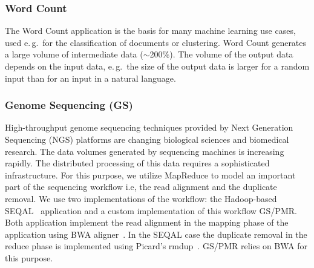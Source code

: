 \documentclass{acm_proc_article-sp}
\newcommand{\jhanote}[1]{ {\textcolor{red} { ***shantenu: #1 }}}
\newcommand{\jhanote}[1]{}
\newcommand{\pilotmapreduce}{Pilot-MapReduce\xspace}
\begin{document}

\subsubsection*{Word Count}

The Word Count application is the basis for many machine learning use cases, 
used e.\,g.\ for the classification of documents or clustering. Word Count 
generates a large volume of intermediate data ($\sim$200$\%$). The volume of the 
output data depends on the input data, e.\,g.\ the size of the output data is 
larger for a random input than for an input in a natural language. 


\subsubsection*{Genome Sequencing (GS)}

High-throughput genome sequencing techniques provided by Next Generation
Sequencing (NGS) platforms are changing biological sciences and biomedical
research. The data volumes generated by sequencing machines is increasing
rapidly. The distributed processing of this data requires a sophisticated
infrastructure. For this purpose, we utilize MapReduce to model an important
part of the sequencing workflow i.e, the read alignment and the duplicate
removal. We use two implementations of the workflow: the Hadoop-based 
SEQAL~\cite{seal-2011} application and a custom implementation of this workflow 
GS/PMR. Both application implement the read alignment in the mapping phase of 
the application using BWA aligner~\cite{Li:2010:FAL:1741823.1741825}. In the 
SEQAL case the duplicate removal in the reduce phase is implemented using  
Picard's rmdup~\cite{picard}. GS/PMR relies on BWA for this purpose.
\end{document}
